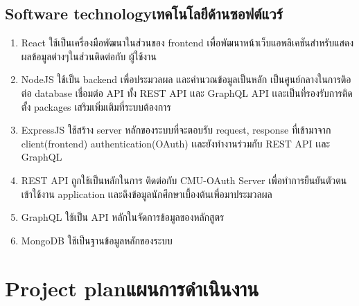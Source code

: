 \subsection{\ifenglish Software technology\else เทคโนโลยีด้านซอฟต์แวร์\fi}
\begin{enumerate}
\item React ใช้เป็นเครื่องมือพัฒนาในส่วนของ frontend เพื่อพัฒนาหน้าเว็บแอพลิเคชันสําหรับแสดงผลข้อมูลต่างๆในส่วนติดต่อกับ ผู้ใช้งาน
\item NodeJS ใช้เป็น backend เพื่อประมวลผล เเละคํานวณข้อมูลเป็นหลัก เป็นศูนย์กลางในการติอต่อ database 
เชื่อมต่อ API ทั้ง REST API เเละ GraphQL API เเละเป็นที่รองรับการติดตั้ง packages เสริมเพิ่มเติมที่ระบบต้องการ
\item ExpressJS ใช้สร้าง server หลักของระบบที่จะตอบรับ request, response ที่เข้ามาจาก client(frontend) 
authentication(OAuth\cite{o}) เเละยังทํางานร่วมกับ REST API\cite{rest} เเละ GraphQL \cite{graphql}
\item REST API ถูกใช้เป็นหลักในการ ติดต่อกับ CMU-OAuth Server เพื่อทําการยืนยันตัวตนเข้าใช้งาน application 
เเละดึงข้อมูลนักศึกษาเบื้องต้นเพื่อมาประมวลผล
\item GraphQL ใช้เป็น API หลักในจัดการข้อมูลของหลักสูตร
\item MongoDB\cite{mongo} ใช้เป็นฐานข้อมูลหลักของระบบ
\end{enumerate}

\section{\ifenglish Project plan\else แผนการดำเนินงาน\fi}

